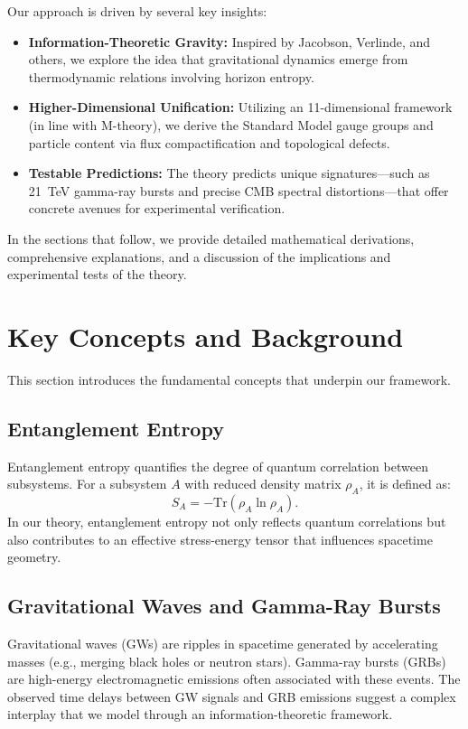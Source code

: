 \documentclass[12pt, a4paper]{article}
\begin{document}
Our approach is driven by several key insights:
\begin{itemize}
    \item \textbf{Information-Theoretic Gravity:} Inspired by Jacobson, Verlinde, and others, we explore the idea that gravitational dynamics emerge from thermodynamic relations involving horizon entropy.
    \item \textbf{Higher-Dimensional Unification:} Utilizing an 11-dimensional framework (in line with M-theory), we derive the Standard Model gauge groups and particle content via flux compactification and topological defects.
    \item \textbf{Testable Predictions:} The theory predicts unique signatures—such as 21~TeV gamma-ray bursts and precise CMB spectral distortions—that offer concrete avenues for experimental verification.
\end{itemize}

In the sections that follow, we provide detailed mathematical derivations, comprehensive explanations, and a discussion of the implications and experimental tests of the theory.

\section{Key Concepts and Background}
This section introduces the fundamental concepts that underpin our framework.

\subsection{Entanglement Entropy}
Entanglement entropy quantifies the degree of quantum correlation between subsystems. For a subsystem \(A\) with reduced density matrix \(\rho_A\), it is defined as:
\begin{equation}
    S_A = -\text{Tr}(\rho_A \ln \rho_A).
\end{equation}
In our theory, entanglement entropy not only reflects quantum correlations but also contributes to an effective stress-energy tensor that influences spacetime geometry.

\subsection{Gravitational Waves and Gamma-Ray Bursts}
Gravitational waves (GWs) are ripples in spacetime generated by accelerating masses (e.g., merging black holes or neutron stars). Gamma-ray bursts (GRBs) are high-energy electromagnetic emissions often associated with these events. The observed time delays between GW signals and GRB emissions suggest a complex interplay that we model through an information-theoretic framework.
\end{document}
